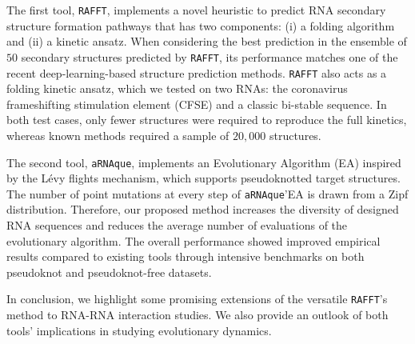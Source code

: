 The first tool, \texttt{RAFFT}, implements a novel heuristic to predict RNA secondary structure formation pathways that has two components: (i) a folding algorithm and (ii) a kinetic ansatz. When considering the best prediction in the ensemble of $50$ secondary structures predicted by \texttt{RAFFT}, its performance matches one of the recent deep-learning-based structure prediction methods. \texttt{RAFFT} also acts as a folding kinetic ansatz, which we tested on two RNAs: the coronavirus frameshifting stimulation element (CFSE) and a classic bi-stable sequence. In both test cases, only fewer structures were required to reproduce the full kinetics, whereas known methods required a sample of $20,000$ structures. 

The second tool, \texttt{aRNAque}, implements an Evolutionary Algorithm (EA) inspired by the Lévy flights mechanism, which supports pseudoknotted target structures. The number of point mutations at every step of \texttt{aRNAque}'EA is drawn from a Zipf distribution. Therefore, our proposed method increases the diversity of designed RNA sequences and reduces the average number of evaluations of the evolutionary algorithm. The overall performance showed improved empirical results compared to existing tools through intensive benchmarks on both pseudoknot and pseudoknot-free datasets. 

In conclusion, we highlight some promising extensions of the versatile \texttt{RAFFT}'s method to RNA-RNA interaction studies. We also provide an outlook of both tools' implications in studying evolutionary dynamics. 
\vfill


\endgroup

\vfill
